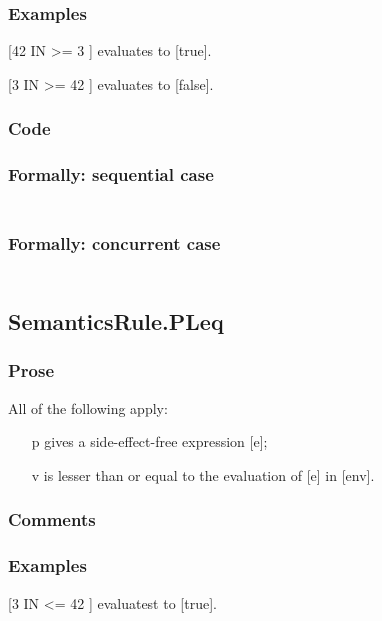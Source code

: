 \documentclass{book}
\begin{document}
    \subsubsection{Examples}
    [42 IN { >= 3 }] evaluates to [true].

    [3 IN { >= 42 }] evaluates to [false].

  \subsubsection{Code}

  \subsubsection{Formally: sequential case}
  \begin{align}
  \end{align} 

  \subsubsection{Formally: concurrent case}
  \begin{align}
  \end{align} 

\subsection{SemanticsRule.PLeq \label{sec:SemanticsRule.PLeq}}

    \subsubsection{Prose}

    All of the following apply:
    \begin{itemize}
    \item [p] gives a side-effect-free expression [e];
    \item [v] is lesser than or equal to the evaluation of [e] in [env].
    \end{itemize}

    \subsubsection{Comments}

    \subsubsection{Examples}
    [3 IN { <= 42 }] evaluatest to [true].
\end{document}

